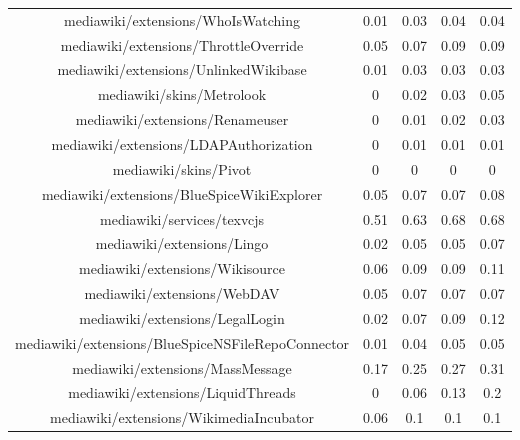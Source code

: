 \begin{center}
\begin{tabular}{@{}c c c c c@{}}
mediawiki/extensions/WhoIsWatching & 0.01 & 0.03 & 0.04 & 0.04 \\
mediawiki/extensions/ThrottleOverride & 0.05 & 0.07 & 0.09 & 0.09 \\
mediawiki/extensions/UnlinkedWikibase & 0.01 & 0.03 & 0.03 & 0.03 \\
mediawiki/skins/Metrolook & 0 & 0.02 & 0.03 & 0.05 \\
mediawiki/extensions/Renameuser & 0 & 0.01 & 0.02 & 0.03 \\
mediawiki/extensions/LDAPAuthorization & 0 & 0.01 & 0.01 & 0.01 \\
mediawiki/skins/Pivot & 0 & 0 & 0 & 0 \\
mediawiki/extensions/BlueSpiceWikiExplorer & 0.05 & 0.07 & 0.07 & 0.08 \\
mediawiki/services/texvcjs & 0.51 & 0.63 & 0.68 & 0.68 \\
mediawiki/extensions/Lingo & 0.02 & 0.05 & 0.05 & 0.07 \\
mediawiki/extensions/Wikisource & 0.06 & 0.09 & 0.09 & 0.11 \\
mediawiki/extensions/WebDAV & 0.05 & 0.07 & 0.07 & 0.07 \\
mediawiki/extensions/LegalLogin & 0.02 & 0.07 & 0.09 & 0.12 \\
mediawiki/extensions/BlueSpiceNSFileRepoConnector & 0.01 & 0.04 & 0.05 & 0.05 \\
mediawiki/extensions/MassMessage & 0.17 & 0.25 & 0.27 & 0.31 \\
mediawiki/extensions/LiquidThreads & 0 & 0.06 & 0.13 & 0.2 \\
mediawiki/extensions/WikimediaIncubator & 0.06 & 0.1 & 0.1 & 0.1 \\
\hline
\end{tabular}
\end{center}

